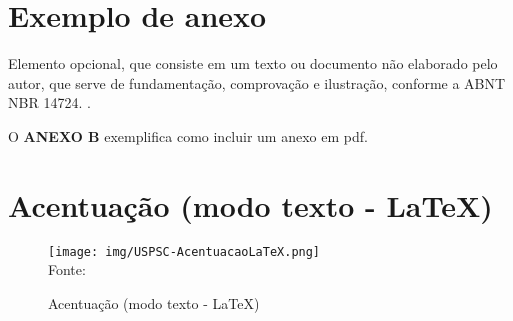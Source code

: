 \begin{anexosenv}

\partanexos

\chapter{Exemplo de anexo}
Elemento opcional, que consiste em um texto ou documento não elaborado pelo autor, que serve de fundamentação, comprovação e ilustração, conforme a ABNT NBR 14724. \cite{nbr14724}.

O \textbf{ANEXO B} exemplifica como incluir um anexo em pdf.

\chapter{Acentuação (modo texto - \LaTeX)}
\begin{figure}[H]
	\begin{center}
	\caption{\label{fig_anexob}Acentuação (modo texto - \LaTeX)}
	\texttt{[image: img/USPSC-AcentuacaoLaTeX.png]} \\
	Fonte: 
	\end{center}	
\end{figure}

\end{anexosenv}
